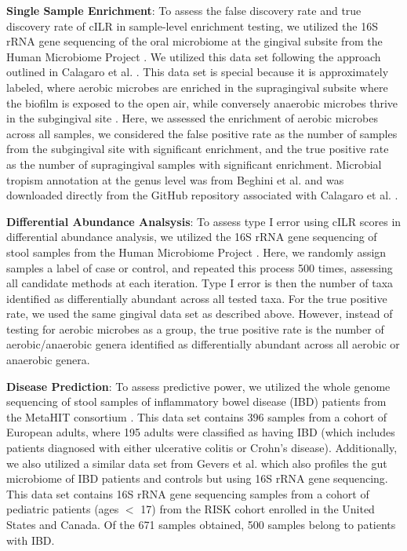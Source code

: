 \documentclass[10pt,letterpaper]{article}
\begin{document}
\noindent \textbf{Single Sample Enrichment}: To assess the false discovery rate and true discovery rate of cILR in sample-level enrichment testing, we utilized the 16S rRNA gene sequencing of the oral microbiome at the gingival subsite from the Human Microbiome Project \cite{consortium2012, proctor2019}. We utilized this data set following the approach outlined in Calagaro et al. \cite{calgaro2020}. This data set is special because it is approximately labeled, where aerobic microbes are enriched in the supragingival subsite where the biofilm is exposed to the open air, while conversely anaerobic microbes thrive in the subgingival site \cite{thurnheer2016}. Here, we assessed the enrichment of aerobic microbes across all samples, we considered the false positive rate as the number of samples from the subgingival site with significant enrichment, and the true positive rate as the number of supragingival samples with significant enrichment. Microbial tropism annotation at the genus level was from Beghini et al. \cite{beghini2019} and was downloaded directly from the GitHub repository associated with Calagaro et al. \cite{matteocalgaro2020}. 

\noindent \textbf{Differential Abundance Analsysis}: To assess type I error using cILR scores in differential abundance analysis, we utilized the 16S rRNA gene sequencing of stool samples from the Human Microbiome Project \cite{consortium2012, proctor2019}. Here, we randomly assign samples a label of case or control, and repeated this process 500 times, assessing all candidate methods at each iteration. Type I error is then the number of taxa identified as differentially abundant across all tested taxa. For the true positive rate, we used the same gingival data set as described above. However, instead of testing for aerobic microbes as a group, the true positive rate is the number of aerobic/anaerobic genera identified as differentially abundant across all aerobic or anaerobic genera. 

\noindent \textbf{Disease Prediction}: To assess predictive power, we utilized the whole genome sequencing of stool samples of inflammatory bowel disease (IBD) patients from the MetaHIT consortium \cite{nielsen2014}. This data set contains 396 samples from a cohort of European adults, where 195 adults were classified as having IBD (which includes patients diagnosed with either ulcerative colitis or Crohn's disease). Additionally, we also utilized a similar data set from Gevers et al. \cite{gevers2014} which also profiles the gut microbiome of IBD patients and controls but using 16S rRNA gene sequencing. This data set contains 16S rRNA gene sequencing samples from a cohort of pediatric patients (ages $<$ 17) from the RISK cohort enrolled in the United States and Canada. Of the 671 samples obtained, 500 samples belong to patients with IBD. 
\end{document}
